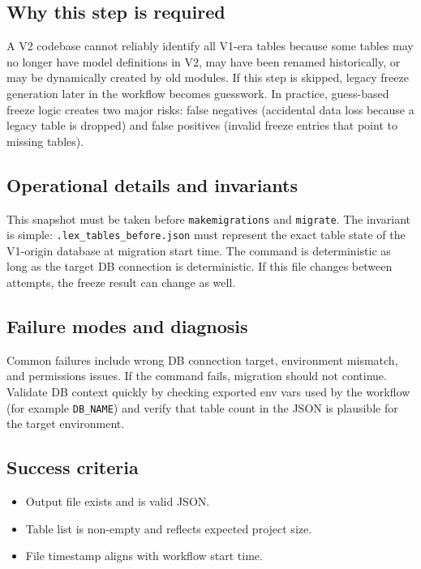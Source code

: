 \documentclass[11pt,a4paper]{article}
\begin{document}
\subsection*{Why this step is required}
A V2 codebase cannot reliably identify all V1-era tables because some tables may no longer
have model definitions in V2, may have been renamed historically, or may be dynamically
created by old modules. If this step is skipped, legacy freeze generation later in the
workflow becomes guesswork. In practice, guess-based freeze logic creates two major risks:
false negatives (accidental data loss because a legacy table is dropped) and false positives
(invalid freeze entries that point to missing tables).

\subsection*{Operational details and invariants}
This snapshot must be taken before \texttt{makemigrations} and \texttt{migrate}. The
invariant is simple: \texttt{.lex\_tables\_before.json} must represent the exact table
state of the V1-origin database at migration start time. The command is deterministic as
long as the target DB connection is deterministic. If this file changes between attempts,
the freeze result can change as well.

\subsection*{Failure modes and diagnosis}
Common failures include wrong DB connection target, environment mismatch, and permissions
issues. If the command fails, migration should not continue. Validate DB context quickly by
checking exported env vars used by the workflow (for example \texttt{DB\_NAME}) and verify
that table count in the JSON is plausible for the target environment.

\subsection*{Success criteria}
\begin{itemize}[leftmargin=1.5em]
  \item Output file exists and is valid JSON.
  \item Table list is non-empty and reflects expected project size.
  \item File timestamp aligns with workflow start time.
\end{itemize}
\end{document}
